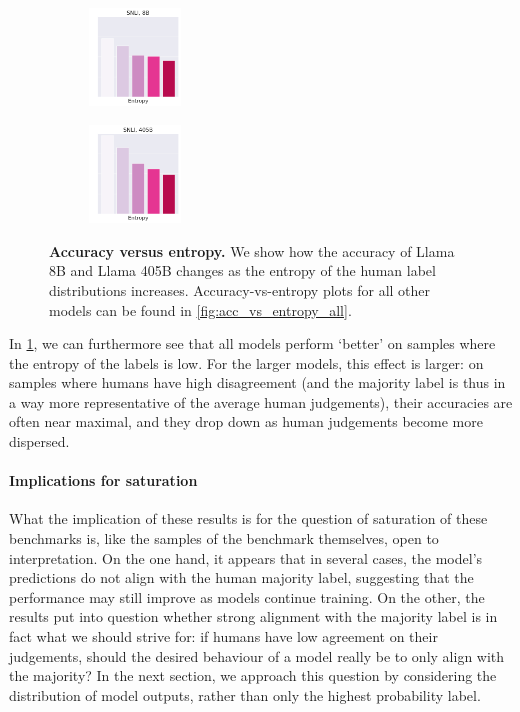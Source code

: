 \begin{figure}[t]
\begin{subfigure}[b]{0.15\textwidth}
        \caption{}
    \end{subfigure}
    \begin{subfigure}[b]{0.15\textwidth}
        \includegraphics[height=2.6cm]{figures/entropy_acc_snli_8B}
        \caption{}
    \end{subfigure}
    \begin{subfigure}[b]{0.15\textwidth}
        \includegraphics[height=2.6cm]{figures/entropy_acc_snli_405B}
        \caption{}
    \end{subfigure}
    \caption{\textbf{Accuracy versus entropy.} We show how the accuracy of Llama 8B and Llama 405B changes as the entropy of the human label distributions increases. Accuracy-vs-entropy plots for all other models can be found in \cref{fig:acc_vs_entropy_all}.}
    \label{fig:entropy_accuracy}
\end{figure}

In \cref{fig:entropy_accuracy}, we can furthermore see that all models perform `better' on samples where the entropy of the labels is low.
For the larger models, this effect is larger: on samples where humans have high disagreement (and the majority label is thus in a way more representative of the average human judgements), their accuracies are often near maximal, and they drop down as human judgements become more dispersed.

\paragraph{Implications for saturation}
What the implication of these results is for the question of saturation of these benchmarks is, like the samples of the benchmark themselves, open to interpretation.
On the one hand, it appears that in several cases, the model's predictions do not align with the human majority label, suggesting that the performance may still improve as models continue training.
On the other, the results put into question whether strong alignment with the majority label is in fact what we should strive for: if humans have low agreement on their judgements, should the desired behaviour of a model really be to only align with the majority?
In the next section, we approach this question by considering the distribution of model outputs, rather than only the highest probability label.

